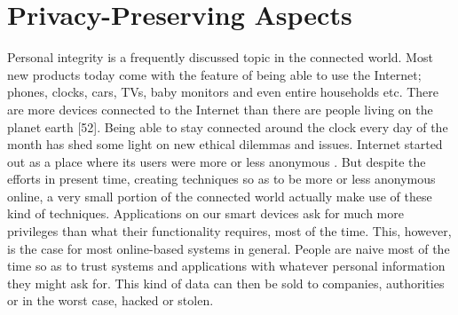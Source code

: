 \chapter{Privacy-Preserving Aspects}
Personal integrity is a frequently discussed topic in the connected world.
Most new products today come with the feature of being able to use the Internet; phones, clocks, cars, TVs, baby monitors and even entire households etc.
There are more devices connected to the Internet than there are people living on the planet earth [52]. Being able to stay connected around the clock every day of the month has shed some light on new ethical dilemmas and issues. Internet started out as a place where its users were more or less anonymous \cite{Aimeur2008}. But despite the efforts in present time, creating techniques so as to be more or less anonymous online, a very small portion of the connected world actually make use of these kind of techniques. Applications on our smart devices ask for much more privileges than what their functionality
requires, most of the time. This, however, is the case for most online-based systems in general. People are naive most of the time so as to trust systems and applications with whatever personal information they might ask for. This kind of data can then be sold to companies, authorities or in the worst case, hacked or stolen.

